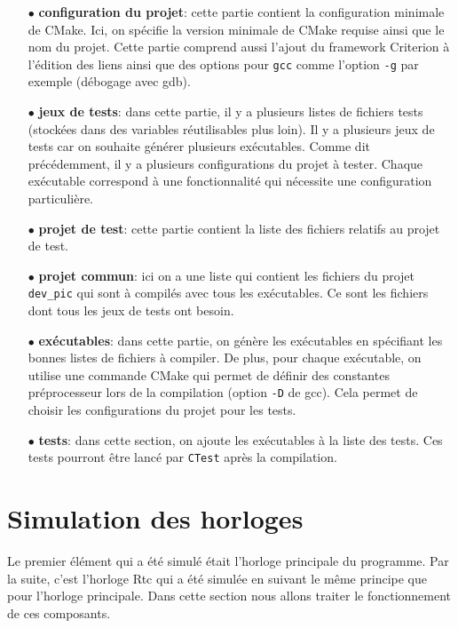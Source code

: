 \documentclass[a4paper]{article}
\begin{document}
\begin{itemize}
  \item[$\bullet$] \textbf{configuration du projet}: cette partie contient la
    configuration minimale de CMake. Ici, on spécifie la version minimale de
    CMake requise ainsi que le nom du projet. Cette partie comprend aussi
    l'ajout du framework Criterion à l'édition des liens ainsi que des options
    pour \verb|gcc| comme l'option \verb|-g| par exemple (débogage
    avec gdb).
  \item[$\bullet$] \textbf{jeux de tests}: dans cette partie, il y a plusieurs
    listes de fichiers tests (stockées dans des variables réutilisables plus
    loin). Il y a plusieurs jeux de tests car on souhaite générer plusieurs
    exécutables. Comme dit précédemment, il y a plusieurs configurations du
    projet à tester. Chaque exécutable correspond à une fonctionnalité qui
    nécessite une configuration particulière.
  \item[$\bullet$] \textbf{projet de test}: cette partie contient la liste des
    fichiers relatifs au projet de test.
  \item[$\bullet$] \textbf{projet commun}: ici on a une liste qui contient les
    fichiers du projet \verb|dev_pic| qui sont à compilés avec tous les
    exécutables. Ce sont les fichiers dont tous les jeux de tests ont besoin.
  \item[$\bullet$] \textbf{exécutables}: dans cette partie, on génère les
    exécutables en spécifiant les bonnes listes de fichiers à compiler. De plus,
    pour chaque exécutable, on utilise une commande CMake qui permet de définir
    des constantes préprocesseur lors de la compilation (option \verb|-D|
    de gcc). Cela permet de choisir les configurations du projet pour les tests.
  \item[$\bullet$] \textbf{tests}: dans cette section, on ajoute les exécutables
    à la liste des tests. Ces tests pourront être lancé par \verb|CTest|
    après la compilation.
\end{itemize}


\section{Simulation des horloges}%
\label{simuhorologes}

Le premier élément qui a été simulé était l'horloge principale du programme. Par
la suite, c'est l'horloge Rtc qui a été simulée en suivant le même principe que
pour l'horloge principale. Dans cette section nous allons traiter le
fonctionnement de ces composants.\\
\end{document}
